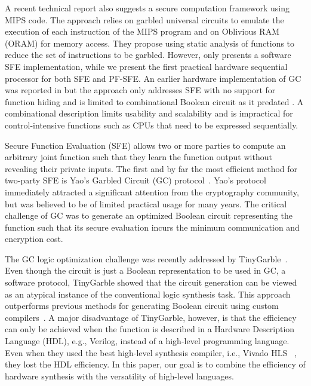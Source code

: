A recent technical report \cite{wang2015secure} also suggests a secure computation framework using MIPS code. The approach relies on garbled universal circuits to emulate the execution of each instruction of the MIPS program and on Oblivious RAM (ORAM) for memory access. They propose using static analysis of functions to reduce the set of instructions to be garbled. However, \cite{wang2015secure} only presents a software SFE implementation, while we present the first practical hardware sequential processor for both SFE and PF-SFE. An earlier hardware implementation of GC was reported in \cite{jarvinen2010garbled} but the approach only addresses SFE with no support for function hiding and is limited to combinational Boolean circuit as it predated \cite{songhori2015tinygarble}. A combinational description limits usability and scalability and is impractical for control-intensive functions such as CPUs that need to be expressed sequentially.


Secure Function Evaluation (SFE) allows two or more parties to compute an arbitrary joint function such that they learn the function output without revealing their private inputs.
The first and by far the most efficient method for two-party SFE is Yao's Garbled Circuit (GC) protocol~\cite{yao1986generate}.
Yao's protocol immediately attracted a significant attention from the cryptography community, but was believed to be of limited practical usage for many years.
The critical challenge of GC was to generate an optimized Boolean circuit representing the function such that its secure evaluation incurs the minimum communication and encryption cost.

The GC logic optimization challenge was recently addressed by TinyGarble~\cite{songhori2015tinygarble}.
Even though the circuit is just a Boolean representation to be used in GC, a software protocol, TinyGarble showed that the circuit generation can be viewed as an atypical instance of the conventional logic synthesis task.
This approach outperforms previous methods for generating Boolean circuit using custom compilers~\cite{malkhi2004fairplay,holzer2012secure, rastogi2014wysteria,demmler2015aby,liu2015oblivm,mood2016frigate}.
A major disadvantage of TinyGarble, however, is that the efficiency can only be achieved when the function is described in a Hardware Description Language (HDL), e.g., Verilog, instead of a high-level programming language.
Even when they used the best high-level synthesis compiler, i.e., Vivado HLS ~\cite{tool:Vivado}, they lost the HDL efficiency.
In this paper, our goal is to combine the efficiency of hardware synthesis with the versatility of high-level languages.

